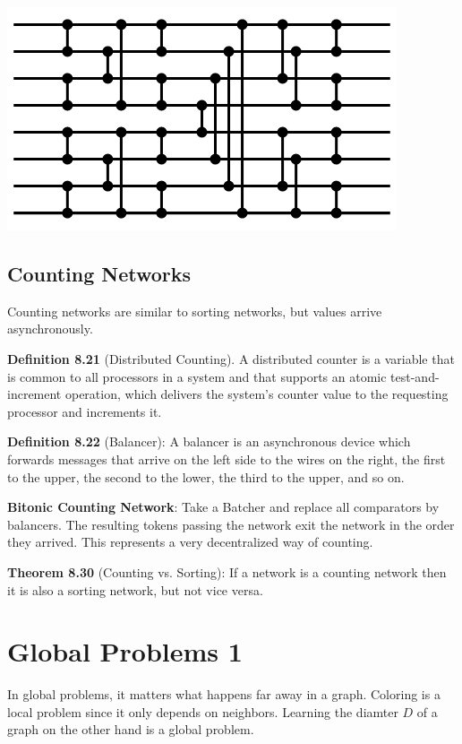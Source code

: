 \documentclass[a4paper, 8pt, landscape]{scrartcl}
\begin{document}
\begin{multicols*}{3}
\begin{minipage}{\columnwidth}
	\centering
	\includegraphics[width=0.58\columnwidth]{source/batcher8}
\end{minipage}

\subsection{Counting Networks}

Counting networks are similar to sorting networks, but values arrive asynchronously.

\textbf{Definition 8.21} (Distributed Counting). A distributed counter is a variable
that is common to all processors in a system and that supports an atomic test-and-increment operation, which delivers the system’s counter value to
the requesting processor and increments it.

\textbf{Definition 8.22} (Balancer): A balancer is an asynchronous device which forwards messages that arrive on the left side to the wires on the right, the first to
the upper, the second to the lower, the third to the upper, and so on.

\textbf{Bitonic Counting Network}: Take a Batcher and replace all comparators by balancers. The resulting tokens passing the network exit the network in the order they arrived. This represents a very decentralized way of counting.

\textbf{Theorem 8.30} (Counting vs. Sorting): If a network is a counting network then it is also a sorting network, but not vice versa.

\section{Global Problems 1}

In global problems, it matters what happens far away in a graph. Coloring is a local problem since it only depends on neighbors. Learning the diamter $D$ of a graph on the other hand is a global problem.


\end{multicols*}
\end{document}
